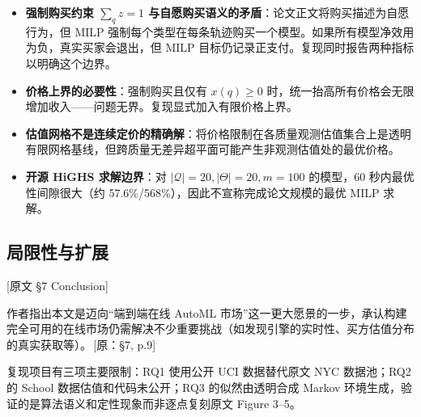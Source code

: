 \documentclass[12pt,a4paper]{article}
\newcommand{\srcref}[1]{\textcolor{black!65}{\footnotesize\,[原：#1]}}
\newcommand{\secref}[1]{\hspace{0.6em} \textcolor{black!80}{\footnotesize [原文 #1]}}
\theoremstyle{definition}
\begin{document}
\begin{itemize}[leftmargin=*]
    \item \textbf{强制购买约束 $\sum_q z = 1$ 与自愿购买语义的矛盾}：论文正文将购买描述为自愿行为，但 MILP 强制每个类型在每条轨迹购买一个模型。如果所有模型净效用为负，真实买家会退出，但 MILP 目标仍记录正支付。复现同时报告两种指标以明确这个边界。
    \item \textbf{价格上界的必要性}：强制购买且仅有 $x(q)\ge0$ 时，统一抬高所有价格会无限增加收入——问题无界。复现显式加入有限价格上界。
    \item \textbf{估值网格不是连续定价的精确解}：将价格限制在各质量观测估值集合上是透明有限网格基线，但跨质量无差异超平面可能产生非观测估值处的最优价格。
    \item \textbf{开源 HiGHS 求解边界}：对 $|\mathcal{Q}|=20,|\Theta|=20,m=100$ 的模型，60 秒内最优性间隙很大（约 57.6\%/568\%），因此不宣称完成论文规模的最优 MILP 求解。
\end{itemize}

\subsection{局限性与扩展}
\secref{§7 Conclusion}

作者指出本文是迈向``端到端在线 AutoML 市场''这一更大愿景的一步，承认构建完全可用的在线市场仍需解决不少重要挑战（如发现引擎的实时性、买方估值分布的真实获取等）。\srcref{§7, p.9}

复现项目有三项主要限制：RQ1 使用公开 UCI 数据替代原文 NYC 数据池；RQ2 的 School 数据估值和代码未公开；RQ3 的似然由透明合成 Markov 环境生成，验证的是算法语义和定性现象而非逐点复刻原文 Figure 3--5。
\end{document}
